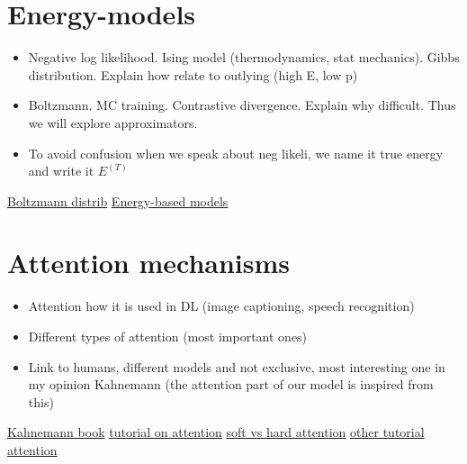 
\section{Energy-models}

\begin{itemize}
\item Negative log likelihood. Ising model (thermodynamics, stat mechanics). Gibbs distribution. Explain how relate to outlying (high E, low p)
\item Boltzmann. MC training. Contrastive divergence. Explain why difficult. Thus we will explore approximators.
\item To avoid confusion when we speak about neg likeli, we name it true energy and write it $E^{(T)}$
\end{itemize}

\href{https://www.lapasserelle.com/statistical_mechanics/lesson_4.pdf}{Boltzmann distrib}
\href{http://citeseerx.ist.psu.edu/viewdoc/download?doi=10.1.1.441.2811&rep=rep1&type=pdf}{Energy-based models}



\section{Attention mechanisms}

\begin{itemize}
\item Attention how it is used in DL (image captioning, speech recognition)
\item Different types of attention (most important ones)
\item Link to humans, different models and not exclusive, most interesting one in my opinion Kahnemann (the attention part of our model is inspired from this)
\end{itemize}

\href{https://scholar.princeton.edu/sites/default/files/kahneman/files/attention_hi_quality.pdf}{Kahnemann book}
\href{https://krntneja.github.io/blog/2018/06/02/attention-based-models-1}{tutorial on attention}
\href{https://jhui.github.io/2017/03/15/Soft-and-hard-attention/}{soft vs hard attention}
\href{https://lilianweng.github.io/lil-log/2018/06/24/attention-attention.html}{other tutorial attention}



